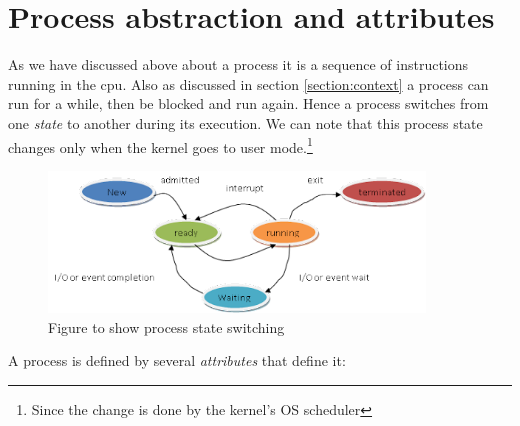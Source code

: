 \documentclass[12pt]{article}
\begin{document}
    \section{Process abstraction and attributes}

    As we have discussed above about a process it is a sequence of instructions running in the cpu.
    Also as discussed in section \ref{section:context} a process can run for a while, then be blocked and run again.
    Hence a process switches from one \textit{state} to another during its execution. We can note that this process state changes only when the kernel goes to user mode.\footnote{Since the change is done by the kernel's OS scheduler}

    \begin{figure}[h]
        \centering
        \includegraphics[width = 10cm]{process-state.png}
        \caption{Figure to show process state switching}
        \label{process-state}
    \end{figure}
    {\large A process is defined by several \textit{attributes} that define it:}
\end{document}
